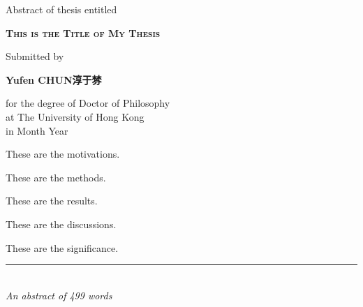 

%
%
\begin{titlepage}
	\begin{center}
	
	Abstract of thesis entitled\\
	
	 \bigskip 
	   	
        \huge\textsc{\textbf{This is the Title of My Thesis}} \\
            
        \bigskip
        	
        {\normalsize Submitted by}\\
			
	\bigskip  	
        
        \Large{\textbf{Yufen CHUN}}\textbf{淳于棼}\\
       
	\bigskip
	       
	{\normalsize
	for the degree of Doctor of Philosophy\\
	at The University of Hong Kong\\
	in Month Year\\}
        
        \end{center}    
	
	\bigskip
	
	These are the motivations. \lipsum[1]
	
	These are the methods. \lipsum[1]
	
	These are the results. \lipsum[1]
	
	These are the discussions. \lipsum[1]
	
	These are the significance. \lipsum[1]
	
	\bigskip
	
	\begin{center}
	
	\rule{6cm}{0.025cm}\\
	{\slshape An abstract of 499 words}
	
	\end{center}  
\end{titlepage}   
